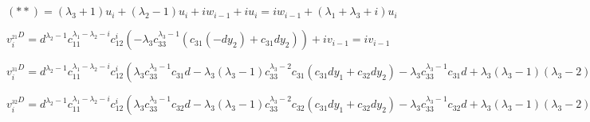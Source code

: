 \\
\\
$ (**) = (\lambda_3 + 1) u_i + (\lambda_2 - 1) u_i + i w_{i - 1} + i u_i = 
i w_{i - 1} + (\lambda_1 + \lambda_3 + i) u_i $
\newline

%
%
$ v_i^{_{21}D} = d^{\lambda_2 - 1} c_{11}^{\lambda_1 - \lambda_2 - i} c_{12}^i (- \lambda_3 c_{33}^{\lambda_3 - 1} (c_{31} (-d y_2) + c_{31} d y_2)) + i v_{i - 1} = i v_{i - 1} $
\newline

%
%
$ v_i^{_{31}D} = d^{\lambda_2 - 1} c_{11}^{\lambda_1 - \lambda_2 - i} c_{12}^i (\lambda_3 c_{33}^{\lambda_3 - 1} c_{31} d - \lambda_3 (\lambda_3 - 1) c_{33}^{\lambda_3 - 2} c_{31} (c_{31} d y_1 + c_{32} d y_2) - \lambda_3 c_{33}^{\lambda_3 - 1} c_{31} d + \lambda_3 (\lambda_3 - 1) (\lambda_3 - 2) c_{33}^{\lambda_3 - 3} c_{31}c_{31}c_{13}c_{32}c_{23} + \lambda_3 (\lambda_3 - 1) c_{33}^{\lambda_3 - 2} (c_{31}c_{11}c_{32}c_{23} + c_{31}c_{13}c_{32}c_{21})) = d^{\lambda_2 - 1} c_{11}^{\lambda_1 - \lambda_2 - i} c_{12}^i (- \lambda_3 (\lambda_3 - 1) c_{33}^{\lambda_3 - 2} c_{31} c_{32} d y_2  + \lambda_3 (\lambda_3 - 1) c_{33}^{\lambda_3 - 2} c_{31}c_{32}(c_{11}c_{23} - c_{13}c_{21})) = 0 $
\newline

%
%
$  v_i^{_{32}D} = d^{\lambda_2 - 1} c_{11}^{\lambda_1 - \lambda_2 - i} c_{12}^i (\lambda_3 c_{33}^{\lambda_3 - 1} c_{32} d - \lambda_3 (\lambda_3 - 1) c_{33}^{\lambda_3 - 2} c_{32} (c_{31} d y_1 + c_{32} d y_2) - \lambda_3 c_{33}^{\lambda_3 - 1} c_{32} d + \lambda_3 (\lambda_3 - 1) (\lambda_3 - 2) c_{33}^{\lambda_3 - 3} c_{32}c_{31}c_{13}c_{32}c_{23} + \lambda_3 (\lambda_3 - 1) c_{33}^{\lambda_3 - 2} (c_{31}c_{12}c_{32}c_{23} + c_{31}c_{13}c_{32}c_{22})) = d^{\lambda_2 - 1} c_{11}^{\lambda_1 - \lambda_2 - i} c_{12}^i (- \lambda_3 (\lambda_3 - 1) c_{33}^{\lambda_3 - 2} c_{32} c_{31} d y_1  + \lambda_3 (\lambda_3 - 1) c_{33}^{\lambda_3 - 2} c_{32}c_{31}(c_{13}c_{22} - c_{12}c_{23})) = 0 $